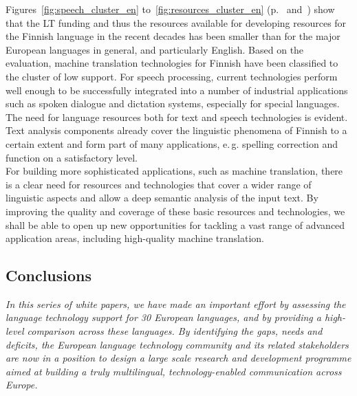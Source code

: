 \begin{multicols}{2}
Figures~\ref{fig:speech_cluster_en} to~\ref{fig:resources_cluster_en} (p.~\pageref{fig:speech_cluster_en} and~\pageref{fig:resources_cluster_en}) show that the LT funding and thus the resources available for
developing resources for the Finnish language in the recent decades has been
smaller than for the major European languages in general, and particularly
English. Based on the evaluation, machine translation technologies for Finnish
have been classified to the cluster of low support. For speech processing,
current technologies perform well enough to be successfully integrated into a
number of industrial applications such as spoken dialogue and dictation
systems, especially for special languages. The need for language resources both
for text and speech technologies is evident. Text analysis components already
cover the linguistic phenomena of Finnish to a certain extent and form part of
many applications, e.\,g. spelling correction and function on a satisfactory
level.\\
For building more sophisticated applications, such as machine translation,
there is a clear need for resources and technologies that cover a wider range
of linguistic aspects and allow a deep semantic analysis of the input text. By
improving the quality and coverage of these basic resources and technologies,
we shall be able to open up new opportunities for tackling a vast range of
advanced application areas, including high-quality machine translation.

\subsection{Conclusions}

\emph{In this series of white papers, we have made an important effort by assessing the language technology support for 30 European languages, and by providing a high-level comparison across these languages. By identifying the gaps, needs and deficits, the European language technology community and its related stakeholders are now in a position to design a large scale research and development programme aimed at building a truly multilingual, technology-enabled communication across Europe.}


\end{multicols}
